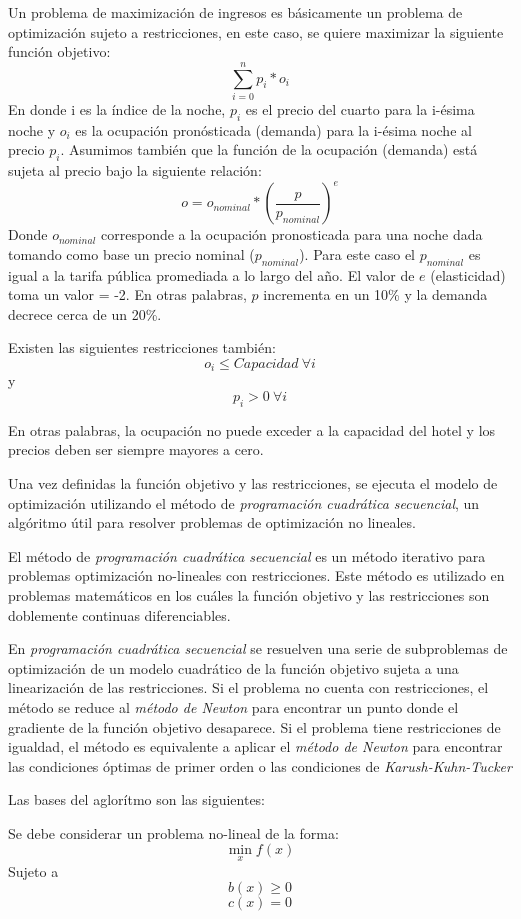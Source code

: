 Un problema de maximización de ingresos es básicamente un problema de optimización sujeto a restricciones, en este caso, se quiere maximizar la siguiente función objetivo:
$$\sum_{i=0}^{n}p_i*o_i$$
En donde i es la índice de la noche, $p_i$ es el precio del cuarto para la i-ésima noche y $o_i$ es la ocupación pronósticada (demanda) para la i-ésima noche al precio $p_i$. Asumimos también que la función de la ocupación (demanda) está sujeta al precio bajo la siguiente relación:
$$o = o_{nominal} * (\frac{p}{p_{nominal}})^e$$
Donde $o_{nominal}$ corresponde a la ocupación pronosticada para una noche dada tomando como base un precio nominal ($p_{nominal}$). Para este caso el $p_{nominal}$ es igual a la tarifa pública promediada a lo largo del año. El valor de $e$ (elasticidad) toma un valor = -2. En otras palabras, $p$ incrementa en un 10\% y la demanda decrece cerca de un 20\%.

Existen las siguientes restricciones también: $$o_i \leq Capacidad\ \forall i$$ y $$p_i > 0\ \forall i$$

En otras palabras, la ocupación no puede exceder a la capacidad del hotel y los precios deben ser siempre mayores a cero.

Una vez definidas la función objetivo y las restricciones, se ejecuta el modelo de optimización utilizando el método de \emph{programación cuadrática secuencial}, un algóritmo útil para resolver problemas de optimización no lineales.

El método de \emph{programación cuadrática secuencial} es un método iterativo para problemas optimización no-lineales con restricciones. Este método es utilizado en problemas matemáticos en los cuáles la función objetivo y las restricciones son doblemente continuas diferenciables.

En \emph{programación cuadrática secuencial} se resuelven una serie de subproblemas de optimización de un modelo cuadrático de la función objetivo sujeta a una linearización de las restricciones. Si el problema no cuenta con restricciones, el método se reduce al \emph{método de Newton} para encontrar un punto donde el gradiente de la función objetivo desaparece. Si el problema tiene restricciones de igualdad, el método es equivalente a aplicar el \emph{método de Newton} para encontrar las condiciones óptimas de primer orden o las condiciones de \emph{Karush-Kuhn-Tucker}

Las bases del aglorítmo son las siguientes:

Se debe considerar un problema no-lineal de la forma: $$\min_x f(x)$$ Sujeto a $$b(x) \geq 0$$ $$c(x) = 0$$

